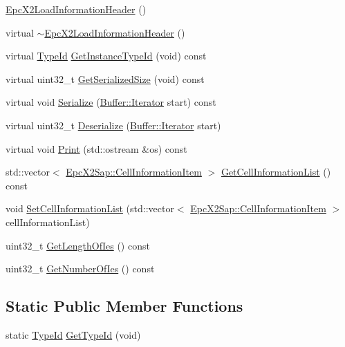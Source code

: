 \begin{DoxyCompactItemize}
\item 
\hyperlink{classns3_1_1EpcX2LoadInformationHeader_a79212f3e88b5450ad61af85ce18f9250}{Epc\+X2\+Load\+Information\+Header} ()
\item 
virtual \hyperlink{classns3_1_1EpcX2LoadInformationHeader_acdf2f5120a478a53ae1343b9105479f4}{$\sim$\+Epc\+X2\+Load\+Information\+Header} ()
\item 
virtual \hyperlink{classns3_1_1TypeId}{Type\+Id} \hyperlink{classns3_1_1EpcX2LoadInformationHeader_aa5ffd8553749b708eca391b2121448fe}{Get\+Instance\+Type\+Id} (void) const 
\item 
virtual uint32\+\_\+t \hyperlink{classns3_1_1EpcX2LoadInformationHeader_a080dce4becd47c7427b1597e41af05f7}{Get\+Serialized\+Size} (void) const 
\item 
virtual void \hyperlink{classns3_1_1EpcX2LoadInformationHeader_abfbb623504f294a9638d36dd37c6d6c6}{Serialize} (\hyperlink{classns3_1_1Buffer_1_1Iterator}{Buffer\+::\+Iterator} start) const 
\item 
virtual uint32\+\_\+t \hyperlink{classns3_1_1EpcX2LoadInformationHeader_aa437f42a2a2c53faa32596ce3e9cf287}{Deserialize} (\hyperlink{classns3_1_1Buffer_1_1Iterator}{Buffer\+::\+Iterator} start)
\item 
virtual void \hyperlink{classns3_1_1EpcX2LoadInformationHeader_aa5269f32ecd4c50032c71d6b837b839b}{Print} (std\+::ostream \&os) const 
\item 
std\+::vector$<$ \hyperlink{structns3_1_1EpcX2Sap_1_1CellInformationItem}{Epc\+X2\+Sap\+::\+Cell\+Information\+Item} $>$ \hyperlink{classns3_1_1EpcX2LoadInformationHeader_a55f8303b3c44f19f5736f2a98570aa6f}{Get\+Cell\+Information\+List} () const 
\item 
void \hyperlink{classns3_1_1EpcX2LoadInformationHeader_a8e0fb5b12fc0b9b307a70e88f971a34c}{Set\+Cell\+Information\+List} (std\+::vector$<$ \hyperlink{structns3_1_1EpcX2Sap_1_1CellInformationItem}{Epc\+X2\+Sap\+::\+Cell\+Information\+Item} $>$ cell\+Information\+List)
\item 
uint32\+\_\+t \hyperlink{classns3_1_1EpcX2LoadInformationHeader_a242ac0ba06018add0649454d948983a5}{Get\+Length\+Of\+Ies} () const 
\item 
uint32\+\_\+t \hyperlink{classns3_1_1EpcX2LoadInformationHeader_a9440e50dfdd205c2507fcf9f01fb6288}{Get\+Number\+Of\+Ies} () const 
\end{DoxyCompactItemize}
\subsection*{Static Public Member Functions}
\begin{DoxyCompactItemize}
\item 
static \hyperlink{classns3_1_1TypeId}{Type\+Id} \hyperlink{classns3_1_1EpcX2LoadInformationHeader_ab678ce09072e3c574d318d248860ade0}{Get\+Type\+Id} (void)
\end{DoxyCompactItemize}
